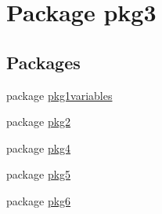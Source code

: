 \hypertarget{namespacepkg3}{}\section{Package pkg3}
\label{namespacepkg3}
\subsection*{Packages}
\begin{DoxyCompactItemize}
\item 
package \mbox{\hyperlink{namespacepkg3_1_1pkg1variables}{pkg1variables}}
\item 
package \mbox{\hyperlink{namespacepkg3_1_1pkg2}{pkg2}}
\item 
package \mbox{\hyperlink{namespacepkg3_1_1pkg4}{pkg4}}
\item 
package \mbox{\hyperlink{namespacepkg3_1_1pkg5}{pkg5}}
\item 
package \mbox{\hyperlink{namespacepkg3_1_1pkg6}{pkg6}}
\end{DoxyCompactItemize}

